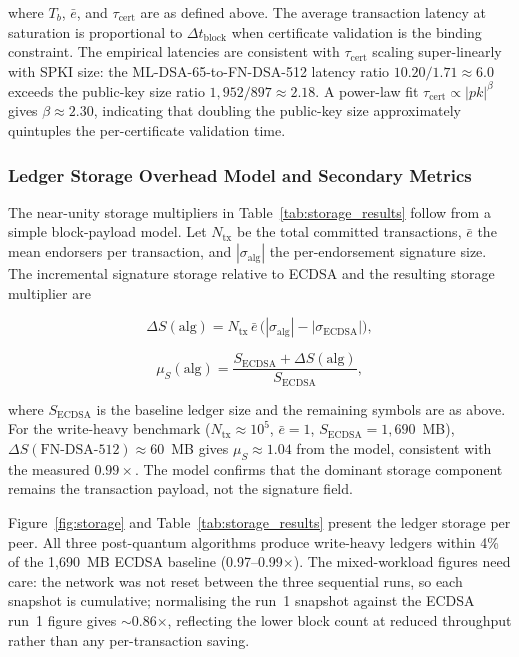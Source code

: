 \documentclass{ieeetj}
\begin{document}
where $T_b$, $\bar{e}$, and $\tau_{\mathrm{cert}}$ are as defined above. The
average transaction latency at saturation is proportional to
$\Delta t_{\mathrm{block}}$ when certificate validation is the binding
constraint. The empirical latencies are consistent with $\tau_{\mathrm{cert}}$
scaling super-linearly with SPKI size: the ML-DSA-65-to-FN-DSA-512 latency ratio
$10.20/1.71\approx6.0$ exceeds the public-key size ratio
$1{,}952/897\approx2.18$. A power-law fit
$\tau_{\mathrm{cert}}\propto|\mathit{pk}|^{\beta}$ gives
$\beta\approx2.30$, indicating that doubling the public-key size approximately
quintuples the per-certificate validation time.

\subsubsection{Ledger Storage Overhead Model and Secondary Metrics}

The near-unity storage multipliers in Table~\ref{tab:storage_results} follow from
a simple block-payload model. Let $N_{\mathrm{tx}}$ be the total committed
transactions, $\bar{e}$ the mean endorsers per transaction, and
$|\sigma_{\mathrm{alg}}|$ the per-endorsement signature size. The incremental
signature storage relative to ECDSA and the resulting storage multiplier are

\begin{equation}
\Delta S(\mathrm{alg})
= N_{\mathrm{tx}}\,\bar{e}\,
\bigl(|\sigma_{\mathrm{alg}}|-|\sigma_{\mathrm{ECDSA}}|\bigr),
\label{eq:storage_model}
\end{equation}

\begin{equation}
\mu_S(\mathrm{alg})
= \frac{S_{\mathrm{ECDSA}}+\Delta S(\mathrm{alg})}{S_{\mathrm{ECDSA}}},
\label{eq:storage_multiplier}
\end{equation}

where $S_{\mathrm{ECDSA}}$ is the baseline ledger size and the remaining symbols
are as above. For the write-heavy benchmark
($N_{\mathrm{tx}}\approx10^5$, $\bar{e}=1$, $S_{\mathrm{ECDSA}}=1{,}690$~MB),
$\Delta S(\text{FN-DSA-512})\approx60$~MB gives $\mu_S\approx1.04$ from the model,
consistent with the measured $0.99\times$. The model confirms that the dominant
storage component remains the transaction payload, not the signature field.

Figure~\ref{fig:storage} and Table~\ref{tab:storage_results} present the ledger
storage per peer. All three post-quantum algorithms produce write-heavy ledgers
within 4\% of the 1{,}690~MB ECDSA baseline (0.97--0.99$\times$). The
mixed-workload figures need care: the network was not reset between the three
sequential runs, so each snapshot is cumulative; normalising the run~1 snapshot
against the ECDSA run~1 figure gives $\sim$0.86$\times$, reflecting the lower
block count at reduced throughput rather than any per-transaction saving.
\end{document}
